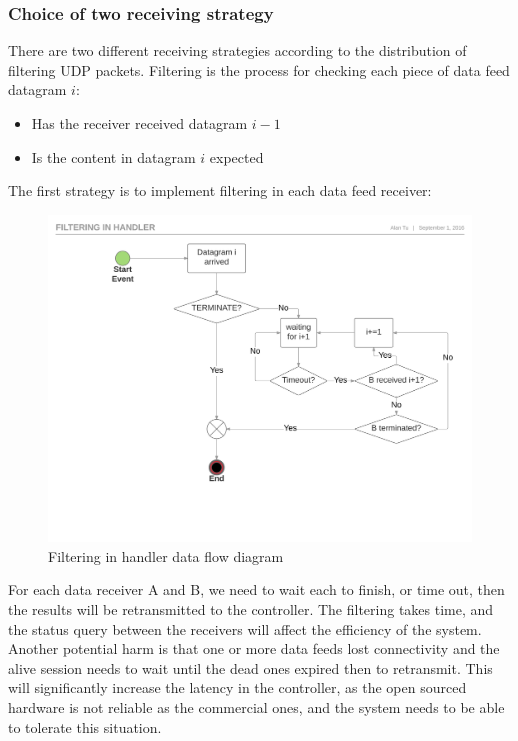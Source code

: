 \documentclass[11pt,openright,a4paper]{report}
\begin{document}
\subsubsection{Choice of two receiving strategy}
There are two different receiving strategies according to the distribution of filtering UDP packets. Filtering is the process for checking each piece of data feed datagram $i$: 
\begin{itemize}
	\item Has the receiver received datagram $i-1$
	\item Is the content in datagram $i$ expected
\end{itemize}
The first strategy is to implement filtering in each data feed receiver:
\begin{figure}[H]
\centering
\includegraphics[width=1.0\linewidth]{"picture/Filtering in handler - Page 1"}
\caption{Filtering in handler data flow diagram}
\label{fig:Filteringinhandler-Page1}
\end{figure}
For each data receiver A and B, we need to wait each to finish, or time out, then the results will be retransmitted to the controller. The filtering takes time, and the status query between the receivers will affect the efficiency of the system. Another potential harm is that one or more data feeds lost connectivity and the alive session needs to wait until the dead ones expired then to retransmit. This will significantly increase the latency in the controller, as the open sourced hardware is not reliable as the commercial ones, and the system needs to be able to tolerate this situation.\\
\end{document}
